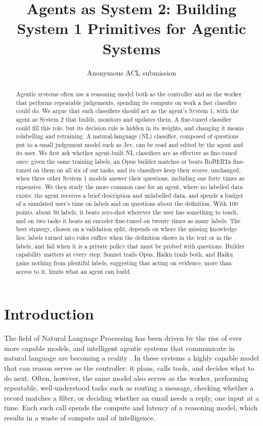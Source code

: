 \documentclass[11pt]{article}
\title{Agents as System 2: Building System 1 Primitives for Agentic Systems}
\author{Anonymous ACL submission}
\begin{document}
\maketitle

\begin{abstract}
Agentic systems often use a reasoning model both as the controller and as the worker that performs repeatable judgements, spending its compute on work a fast classifier could do. We argue that such classifiers should act as the agent's System 1, with the agent as System 2 that builds, monitors and updates them. A fine-tuned classifier could fill this role, but its decision rule is hidden in its weights, and changing it means relabelling and retraining. A natural-language (NL) classifier, composed of questions put to a small judgement model such as Jev, can be read and edited by the agent and its user. We first ask whether agent-built NL classifiers are as effective as fine-tuned ones: given the same training labels, an Opus builder matches or beats RoBERTa fine-tuned on them on all six of our tasks, and its classifiers keep their scores, unchanged, when three other System 1 models answer their questions, including one forty times as expensive. We then study the more common case for an agent, where no labelled data exists: the agent receives a brief description and unlabelled data, and spends a budget of a simulated user's time on labels and on questions about the definition. With 100 points, about 50 labels, it beats zero-shot wherever the user has something to teach, and on two tasks it beats an encoder fine-tuned on twenty times as many labels. The best strategy, chosen on a validation split, depends on where the missing knowledge lies: labels turned into rules suffice when the definition shows in the text or in the labels, and fail when it is a private policy that must be probed with questions. Builder capability matters at every step: Sonnet trails Opus, Haiku trails both, and Haiku gains nothing from plentiful labels, suggesting that acting on evidence, more than access to it, limits what an agent can build.
\end{abstract}

\section{Introduction}

The field of Natural Language Processing has been driven by the rise of ever more capable models, and intelligent agentic systems that communicate in natural language are becoming a reality \citep{yao2023react,schick2023toolformer,wang2024survey}. In these systems a highly capable model that can reason serves as the controller: it plans, calls tools, and decides what to do next. Often, however, the same model also serves as the worker, performing repeatable, well-understood tasks such as routing a message, checking whether a record matches a filter, or deciding whether an email needs a reply, one input at a time. Each such call spends the compute and latency of a reasoning model, which results in a waste of compute and of intelligence.
\end{document}
